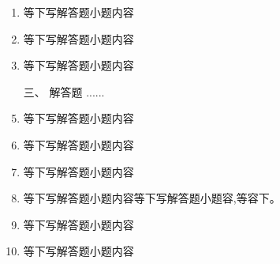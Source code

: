 \documentclass[12pt,twocolumn,landscape,UTF8,twoside]{ctexart}
\begin{document}
\begin{spacing}{1.3}
\begin{enumerate} [1、]
		\item 等下写解答题小题内容 
		\item 等下写解答题小题内容 
		\item 等下写解答题小题内容  		
		\item[\heiti 三、] {\heiti 解答题  ......}
		\item 等下写解答题小题内容 \pd{}
		\item 等下写解答题小题内容 \pd{}
		\item 等下写解答题小题内容 \pd{}
		\item 等下写解答题小题内容等下写解答题小题容,等容下。 \pd{}
		\item 等下写解答题小题内容 \pd{}
		\item 等下写解答题小题内容 \pd{}
	\end{enumerate} 
	\end{spacing}
\end{document}
